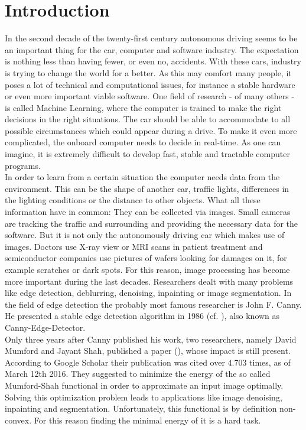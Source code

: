\documentclass[abstracton]{scrreprt}
\begin{document}
\tableofcontents


\chapter{Introduction} %
\label{cha:introduction}
    In the second decade of the twenty-first century autonomous driving seems to be an important thing for the car, computer and software industry. The expectation is nothing less than having fewer, or even no, accidents. With these cars, industry is trying to change the world for a better. As this may comfort many people, it poses a lot of technical and computational issues, for instance a stable hardware or even more important viable software. One field of research - of many others - is called Machine Learning, where the computer is trained to make the right decisions in the right situations. The car should be able to accommodate to all possible circumstances which could appear during a drive. To make it even more complicated, the onboard computer needs to decide in real-time. As one can imagine, it is extremely difficult to develop fast, stable and tractable computer programs.\\
    In order to learn from a certain situation the computer needs data from the environment. This can be the shape of another car, traffic lights, differences in the lighting conditions or the distance to other objects. What all these information have in common: They can be collected via images. Small cameras are tracking the traffic and surrounding and providing the necessary data for the software. But it is not only the autonomously driving car which makes use of images. Doctors use X-ray view or MRI scans in patient treatment and semiconductor companies use pictures of wafers looking for damages on it, for example scratches or dark spots. For this reason, image processing has become more important during the last decades. Researchers dealt with many problems like edge detection, deblurring, denoising, inpainting or image segmentation. In the field of edge detection the probably most famous researcher is John F. Canny. He presented a stable edge detection algorithm in 1986 (cf. \cite{Canny}), also known as Canny-Edge-Detector.\\
    Only three years after Canny published his work, two researchers, namely David Mumford and Jayant Shah, published a paper (\cite{Mumford-et-al-cpam}), whose impact is still present. According to Google Scholar their publication was cited over 4.703 times, as of March 12th 2016. They suggested to minimize the energy of the so called Mumford-Shah functional in order to approximate an input image optimally. Solving this optimization problem leads to applications like image denoising, inpainting and segmentation. Unfortunately, this functional is by definition non-convex. For this reason finding the minimal energy of it is a hard task.\\
\end{document}
